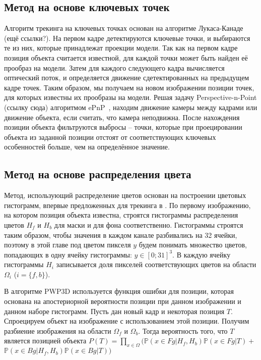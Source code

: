 \subsection{Метод на основе ключевых точек}
Алгоритм трекинга на ключевых точках основан на алгоритме Лукаса-Канаде~\cite{LukasKanade} (ещё ссылки?). На первом кадре детектируются ключевые точки, и выбираются те из них, которые принадлежат проекции модели. Так как на первом кадре позиция объекта считается известной, для каждой точки может быть найден её прообраз на модели. Затем для каждого следующего кадра вычисляется оптический поток, и определяется движение сдетектированных на предыдущем кадре точек. Таким образом, мы получаем на новом изображении позиции точек, для которых известны их прообразы на модели. Решая задачу Perspective-n-Point (ссылку сюда) алгоритмом ePnP~\cite{Lepetit}, находим движение камеры между кадрами или движение объекта, если считать, что камера неподвижна. После нахождения позиции объекта фильтруются выбросы -- точки, которые при проецировании объекта из заданной позиции отстоят от соответствующих ключевых особенностей больше, чем на определённое значение. 

\subsection{Метод на основе распределения цвета}
Метод, использующий распределение цветов основан на построении цветовых гистограмм, впервые предложенных для трекинга в \cite{Bibby2008}. По первому изображению, на котором позиция объекта известна, строятся гистограммы распределения цветов $H_f$ и $H_b$ для маски и для фона соответственно. Гистограммы строятся таким образом, чтобы значения в каждом канале разбивались на 32 ячейки, поэтому в этой главе под цветом пикселя $y$ будем понимать множество цветов, попадающих в одну ячейку гистограммы: $y \in [0; 31]^3$. В каждую ячейку гистограммы $H_i$ записывается доля пикселей соответствующих цветов на области $\Omega_i$ ($i = \{f, b\}$). 

В алгоритме PWP3D \cite{PWP3D} используется функция ошибки для позиции, которая основана на апостериорной вероятности позиции при данном изображении и данном наборе гистограмм. Пусть дан новый кадр и некоторая позиция $T$. Спроецируем объект на изображение с использованием этой позиции. Получим разбиение изображения на области $\Omega_f$ и $\Omega_b$. Тогда вероятность того, что $T$ является позицией объекта $P(T) = \prod\limits_{x \in \Omega}(\mathbb{P}(x \in Fg | H_f, H_b)\mathbb{P}(x \in Fg | T) +$ $\mathbb{P}(x \in Bg|H_f, H_b)\mathbb{P}(x \in Bg | T))$

